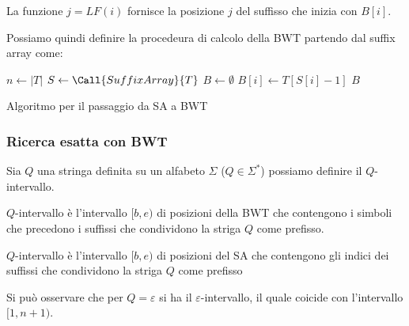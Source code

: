 La funzione $j = LF(i)$ fornisce la posizione $j$ del suffisso che inizia con $B[i]$.

Possiamo quindi definire la procedeura di calcolo della BWT partendo dal suffix
array come:
\begin{algorithm}
    \begin{algorithmic}
        \State $n \gets |T|$
        \State $S \gets \Call{SuffixArray}{T}$
        \State $B \gets \emptyset$
        \State $B[i] \gets T[S[i] - 1]$
        \EndFor
        \State \Return $B$
        \EndFunction
    \end{algorithmic}
    \caption{Algoritmo per il passaggio da SA a BWT}
\end{algorithm}
\subsubsection{Ricerca esatta con BWT}
Sia $Q$ una stringa definita su un alfabeto $\Sigma$ ($Q \in \Sigma^\ast$)
possiamo definire il $Q$-intervallo.
\begin{definizione} 
    $Q$-intervallo è l'intervallo $[b,e)$ di posizioni della BWT che contengono
    i simboli che precedono i suffissi che condividono la striga $Q$ come prefisso.
\end{definizione}
\begin{definizione} 
    $Q$-intervallo è l'intervallo $[b,e)$ di posizioni del SA che contengono
    gli indici dei suffissi che condividono la striga $Q$ come prefisso
\end{definizione}
Si può osservare che per $Q = \varepsilon$ si ha il $\varepsilon$-intervallo,
il quale coicide con l'intervallo $[1,n+1)$.
